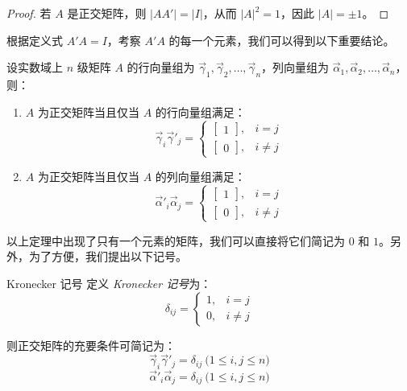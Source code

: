 \begin{proof}
	若 $A$ 是正交矩阵，则 $|AA'| = |I|$，从而 $|A|^2 = 1$，因此 $|A| = \pm 1$。
\end{proof}

根据定义式 $A'A = I$，考察 $A'A$ 的每一个元素，我们可以得到以下重要结论。

\begin{theorem}[正交矩阵的充要条件]
	设实数域上 $n$ 级矩阵 $A$ 的行向量组为 $\vec \gamma_1, \vec \gamma_2, \ldots, \vec \gamma_n$，列向量组为 $\vec \alpha_1, \vec \alpha_2, \ldots, \vec \alpha_n$，则：
	\begin{enumerate}
		\item $A$ 为正交矩阵当且仅当 $A$ 的行向量组满足：
		$$
		\vec \gamma_i \vec \gamma'_j =
		\begin{cases}
			\begin{bmatrix} 1 \end{bmatrix}, & i = j
			\\
			\begin{bmatrix} 0 \end{bmatrix}, & i \ne j
		\end{cases}
		$$
		\item $A$ 为正交矩阵当且仅当 $A$ 的列向量组满足：
		$$
		\vec \alpha'_i \vec \alpha_j =
		\begin{cases}
			\begin{bmatrix} 1 \end{bmatrix}, & i = j
			\\
			\begin{bmatrix} 0 \end{bmatrix}, & i \ne j
		\end{cases}
		$$
	\end{enumerate}
\end{theorem}

以上定理中出现了只有一个元素的矩阵，我们可以直接将它们简记为 $0$ 和 $1$。另外，为了方便，我们提出以下记号。

\begin{definition}{Kronecker 记号}
	定义 \emph{Kronecker 记号}为：
	$$
	\delta_{ij} =
	\begin{cases}
			1, & i = j
			\\
			0, & i \ne j
	\end{cases}
	$$
\end{definition}

则正交矩阵的充要条件可简记为：
$$
\vec \gamma_i \vec \gamma'_j = \delta_{ij} \pod{1 \le i, j \le n}
$$$$
\vec \alpha'_i \vec \alpha_j = \delta_{ij} \pod{1 \le i, j \le n}
$$

